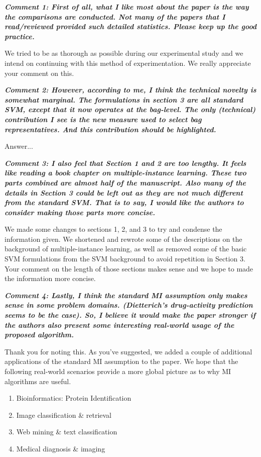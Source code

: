 \documentclass[a4paper,notitlepage]{article}
\begin{document}
\noindent \textbf{\textit{Comment 1: First of all, what I like most about the paper is the way the comparisons are conducted. Not many of the papers that I read/reviewed provided such detailed statistics. Please keep up the good practice. }}

\medskip

\noindent We tried to be as thorough as possible during our experimental study and we intend on continuing with this method of experimentation. We really appreciate your comment on this.

\noindent \textbf{\textit{Comment 2: However, according to me, I think the technical novelty is somewhat marginal. 
The formulations in section 3 are all standard SVM, except that it now operates at the bag-level. The only (technical) contribution I see is the new measure used to select bag representatives. And this contribution should be highlighted. }}

\medskip

\noindent Answer...

\noindent \textbf{\textit{Comment 3: I also feel that Section 1 and 2 are too lengthy. It feels like reading a book chapter on multiple-instance learning. These two parts combined are almost half of the manuscript. Also many of the details in Section 3 could be left out as they are not much different from the standard SVM. That is to say, I would like the authors to consider making those parts more concise. }}

\medskip

\noindent We made some changes to sections 1, 2, and 3 to try and condense the information given. We shortened and rewrote some of the descriptions on the background of multiple-instance learning, as well as removed some of the basic SVM formulations from the SVM background to avoid repetition in Section 3. Your comment on the length of those sections makes sense and we hope to made the information more concise.

\noindent \textbf{\textit{Comment 4: Lastly, I think the standard MI assumption only makes sense in some problem domains. (Dietterich's drug-activity prediction seems to be the case). So, I believe it would make the paper stronger if the authors also present some interesting real-world usage of the proposed algorithm. }}

\medskip

\noindent Thank you for noting this. As you've suggested, we added a couple of additional applications of the standard MI assumption to the paper. We hope that the following real-world scenarios provide a more global picture as to why MI algorithms are useful.
\begin{enumerate}
\item Bioinformatics: Protein Identification
\item Image classification \& retrieval
\item Web mining \& text classification
\item Medical diagnosis \& imaging
\end{enumerate}
\end{document}
